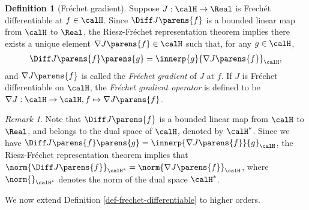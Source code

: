 \documentclass[12pt]{article}
\theoremstyle{definition}
\newtheorem{definition}{Definition}
\theoremstyle{theorem}
\theoremstyle{remark}
\newtheorem{remark}{Remark}
\begin{document}
\begin{definition}[Fr{\'e}chet gradient]
	Suppose $J: \calH \to \Real$ is Frech{\'e}t differentiable at $f \in \calH$. Since $\Diff J \parens{f}$ is a bounded linear map from $\calH$ to $\Real$, the Riesz-Fr{\'e}chet representation theorem \parencites[Fact 2.24 in][]{Bauschke2017-he} implies there exists a unique element $\nabla J \parens{f} \in \calH$ such that, for any $g \in \calH$, 
	\begin{align}\label{eq-frechet-grad}
		\Diff J \parens{f} \parens{g} = \innerp{g}{\nabla J \parens{f}}_{\calH}, 
	\end{align}
	and $\nabla J \parens{f}$ is called the \textit{Fr{\'e}chet gradient} of $J$ at $f$. If $J$ is Fr{\'e}chet differentiable on $\calH$, the \textit{Fr{\'e}chet gradient operator} is defined to be $\nabla J: \calH \to \calH, f \mapsto \nabla J \parens{f}$. 

\end{definition}


\begin{remark}
	Note that $\Diff J \parens{f}$ is a bounded linear map from $\calH$ to $\Real$, and belongs to the dual space of $\calH$, denoted by $\calH^*$. Since we have $\Diff J \parens{f} \parens{g} = \innerp{\nabla J \parens{f}}{g}_{\calH}$, the Riesz-Fr{\'e}chet representation theorem implies that $\norm{\Diff J \parens{f}}_{\calH^*} = \norm{\nabla J \parens{f}}_{\calH}$, where $\norm{}_{\calH^*}$ denotes the norm of the dual space $\calH^*$. 
\end{remark}

We now extend Definition \ref{def-frechet-differentiable} to higher orders. 
\end{document}
